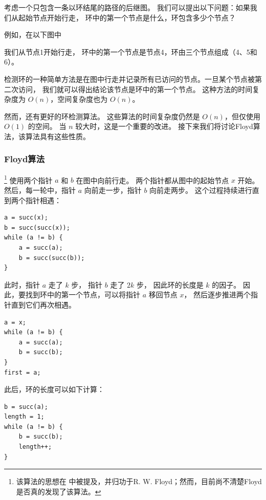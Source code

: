 
考虑一个只包含一条以环结尾的路径的后继图。
我们可以提出以下问题：如果我们从起始节点开始行走，
环中的第一个节点是什么，环包含多少个节点？

例如，在以下图中

\begin{center}
\end{center}
我们从节点1开始行走，
环中的第一个节点是节点4，环由三个节点组成（4、5和6）。

检测环的一种简单方法是在图中行走并记录所有已访问的节点。一旦某个节点被第二次访问，
我们就可以得出结论该节点是环中的第一个节点。
这种方法的时间复杂度为 $O(n)$，空间复杂度也为 $O(n)$。

然而，还有更好的环检测算法。
这些算法的时间复杂度仍然是 $O(n)$，但仅使用 $O(1)$ 的空间。
当 $n$ 较大时，这是一个重要的改进。
接下来我们将讨论Floyd算法，该算法具有这些性质。

\subsubsection{Floyd算法}


\footnote{该算法的思想在 \cite{knu982} 中被提及，并归功于R. W. Floyd；然而，目前尚不清楚Floyd是否真的发现了该算法。} 使用两个指针 $a$ 和 $b$ 在图中向前行走。
两个指针都从图中的起始节点 $x$ 开始。
然后，每一轮中，指针 $a$ 向前走一步，指针 $b$ 向前走两步。
这个过程持续进行直到两个指针相遇：
\begin{lstlisting}
a = succ(x);
b = succ(succ(x));
while (a != b) {
    a = succ(a);
    b = succ(succ(b));
}
\end{lstlisting}

此时，指针 $a$ 走了 $k$ 步，
指针 $b$ 走了 $2k$ 步，
因此环的长度是 $k$ 的因子。
因此，要找到环中的第一个节点，可以将指针 $a$ 移回节点 $x$，
然后逐步推进两个指针直到它们再次相遇。
\begin{lstlisting}
a = x;
while (a != b) {
    a = succ(a);
    b = succ(b);
}
first = a;
\end{lstlisting}

此后，环的长度可以如下计算：
\begin{lstlisting}
b = succ(a);
length = 1;
while (a != b) {
    b = succ(b);
    length++;
}
\end{lstlisting}
